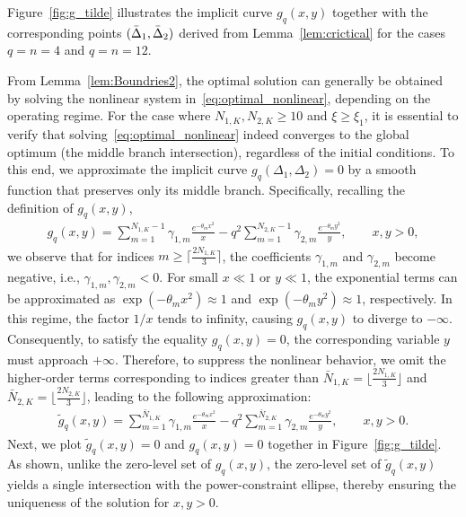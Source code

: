\documentclass[journal,12pt,onecolumn,draftclsnofoot]{IEEEtran}
\theoremstyle{definition}
\begin{document}
Figure~\ref{fig:g_tilde} illustrates the implicit curve \(g_q(x, y)\) together with the corresponding points \((\Bar{\Delta}_1, \Bar{\Delta}_2)\) derived from Lemma~\ref{lem:crictical} for the cases \(q = n = 4\) and \(q = n = 12\).




From Lemma~\ref{lem:Boundries2}, the optimal solution can generally be obtained by solving the nonlinear system in~\eqref{eq:optimal_nonlinear}, depending on the operating regime. For the case where \(N_{1,K}, N_{2,K} \geq 10\) and \(\xi \geq \xi_1\), it is essential to verify that solving~\eqref{eq:optimal_nonlinear} indeed converges to the global optimum (the middle branch intersection), regardless of the initial conditions. To this end, we approximate the implicit curve \(g_q(\Delta_1, \Delta_2) = 0\) by a smooth function that preserves only its middle branch.  Specifically, recalling the definition of \(g_q(x,y)\),
\begin{align*}
    g_q(x,y) =  \sum_{m=1}^{N_{1,K}-1} \gamma_{1,m} \frac{e^{-\theta_{m}x^2}}{x}
    - q^2 \sum_{m=1}^{N_{2,K}-1} \gamma_{2,m} \frac{e^{-\theta_{m}y^2}}{y},
    \qquad x,y>0,
\end{align*}
we observe that for indices \(m \geq \lceil \frac{2N_{1,K}}{3} \rceil\), the coefficients \(\gamma_{1,m}\) and \(\gamma_{2,m}\) become negative, i.e., \(\gamma_{1,m}, \gamma_{2,m} < 0\). For small \(x \ll 1\) or \(y \ll 1\), the exponential terms can be approximated as \(\exp(-\theta_m x^2) \approx 1\) and \(\exp(-\theta_m y^2) \approx 1\), respectively. In this regime, the factor \(1/x\) tends to infinity, causing \(g_q(x,y)\) to diverge to \(-\infty\). Consequently, to satisfy the equality \(g_q(x,y) = 0\), the corresponding variable \(y\) must approach \(+\infty\).  Therefore, to suppress the nonlinear behavior, we omit the higher-order terms corresponding to indices greater than $\bar{N}_{1,K} = \lfloor \frac{2N_{1,K}}{3} \rfloor$ and $\bar{N}_{2,K} = \lfloor \frac{2N_{2,K}}{3} \rfloor$, leading to the following approximation:
\begin{align}\label{eq:gq2tild}
    \tilde{g}_q(x,y) =
    \sum_{m=1}^{\bar{N}_{1,K}} \gamma_{1,m} \frac{e^{-\theta_{m}x^2}}{x}
    - q^2 \sum_{m=1}^{\bar{N}_{2,K}} \gamma_{2,m} \frac{e^{-\theta_{m}y^2}}{y},
    \qquad x, y > 0.
\end{align}
Next, we plot $\tilde{g}_q(x,y) = 0$ and $g_q(x,y) = 0$ together in Figure~\ref{fig:g_tilde}. As shown, unlike the zero-level set of $g_q(x,y)$, the zero-level set of $\tilde{g}_q(x,y)$ yields a single intersection with the power-constraint ellipse, thereby ensuring the uniqueness of the solution for $x, y > 0$. 
\end{document}
